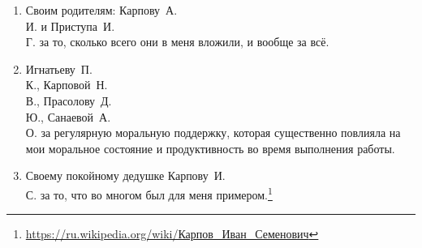 \begin{enumerate}
\item Своим родителям: Карпову~А.\\И. и Приступа~И.\\Г. за то, сколько всего они в меня вложили, и вообще за всё.
\item Игнатьеву~П.\\К., Карповой~Н.\\В., Прасолову~Д.\\Ю., Санаевой~А.\\О. за регулярную моральную поддержку, которая существенно повлияла на мои моральное состояние и продуктивность во время выполнения работы. 
\item Своему покойному дедушке Карпову~И.\\С. за то, что во многом был для меня примером.\footnote{\url{https://ru.wikipedia.org/wiki/Карпов\_Иван\_Семенович}}
\end{enumerate}


